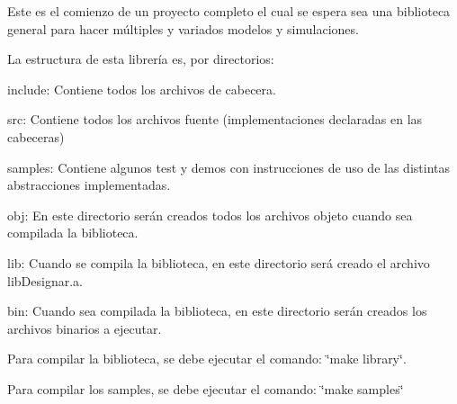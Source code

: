 Este es el comienzo de un proyecto completo el cual se espera sea una biblioteca general para hacer múltiples y variados modelos y simulaciones.

La estructura de esta librería es, por directorios\+:


\begin{DoxyItemize}
\item include\+: Contiene todos los archivos de cabecera.
\item src\+: Contiene todos los archivos fuente (implementaciones declaradas en las cabeceras)
\item samples\+: Contiene algunos test y demos con instrucciones de uso de las distintas abstracciones implementadas.
\item obj\+: En este directorio serán creados todos los archivos objeto cuando sea compilada la biblioteca.
\item lib\+: Cuando se compila la biblioteca, en este directorio será creado el archivo lib\+Designar.\+a.
\item bin\+: Cuando sea compilada la biblioteca, en este directorio serán creados los archivos binarios a ejecutar.
\end{DoxyItemize}

Para compilar la biblioteca, se debe ejecutar el comando\+: \char`\"{}make library\char`\"{}.

Para compilar los samples, se debe ejecutar el comando\+: \char`\"{}make samples\char`\"{} 